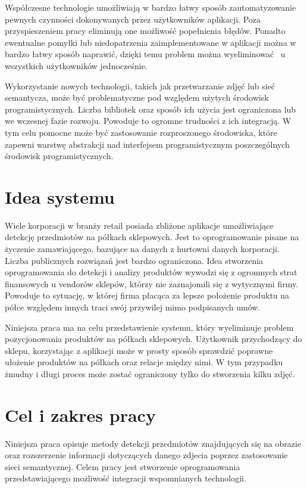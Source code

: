 Współczesne technologie umożliwiają w bardzo łatwy sposób zautomatyzowanie pewnych czynności dokonywanych przez użytkowników aplikacji. Poza przyspieszeniem pracy eliminują one możliwość popełnienia błędów. Ponadto ewentualne pomyłki lub niedopatrzenia zaimplementowane w aplikacji można w bardzo łatwy sposób naprawić, dzięki temu problem można wyeliminować ~u wszystkich użytkowników jednocześnie. 

Wykorzystanie nowych technologii, takich jak przetwarzanie zdjęć lub sieć semantycza, może być problematyczne pod względem użytych środowisk programistycznych. Liczba bibliotek oraz sposób ich użycia jest ograniczona lub we wczesnej fazie rozwoju. Powoduje to ogromne trudności z ich integracją. W tym celu pomocne może być zastosowanie rozproszonego środowiska, które zapewni warstwę abstrakcji nad interfejsem programistycznym poszczególnych środowisk programistycznych.

\section{Idea systemu}
Wiele korporacji w branży retail posiada zbliżone aplikacje umożliwiające detekcję przedmiotów na półkach sklepowych. Jest to oprogramowanie pisane na życzenie zamawiającego, bazujące na danych z hurtowni danych korporacji. Liczba publicznych rozwiązań jest bardzo ograniczona. 
Idea stworzenia oprogramowania do detekcji i analizy produktów wywodzi się z ogromnych strat finansowych u vendorów sklepów, którzy nie zaznajomili się z wytycznymi firmy. Powoduje to sytuację, w której firma płacąca za lepsze położenie produktu na półce względem innych traci swój przywilej mimo podpisanych umów. 

Niniejsza praca ma na celu przedstawienie systemu, który wyeliminuje problem pozycjonowania produktów na półkach sklepowych. Użytkownik przychodzący do sklepu, korzystając z aplikacji może w prosty sposób sprawdzić poprawne ułożenie produktów na półkach oraz relacje między nimi. W tym przypadku żmudny i długi proces może zostać ograniczony tylko do stworzenia kilku zdjęć. 

\section{Cel i zakres pracy}
Niniejsza praca opisuje metody detekcji przedmiotów znajdujących się na obrazie oraz rozszerzenie informacji dotyczących danego zdjecia poprzez zastosowanie sieci semantycznej. Celem pracy jest stworzenie oprogramowania przedstawiającego możliwość integracji wspomnianych technologii.


